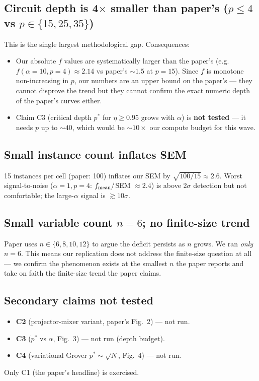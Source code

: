 \documentclass[11pt]{article}
\begin{document}
\subsection{Circuit depth is 4$\times$ smaller than paper's ($p\le 4$ vs $p\in\{15,25,35\}$)}
This is the single largest methodological gap. Consequences:
\begin{itemize}
  \item Our absolute \(f\) values are systematically larger than the
        paper's (e.g.\ \(f(\alpha{=}10,p{=}4)\approx 2.14\) vs paper's
        \(\sim 1.5\) at \(p{=}15\)). Since \(f\) is monotone
        non-increasing in \(p\), our numbers are an upper bound on the
        paper's --- they cannot disprove the trend but they cannot
        confirm the exact numeric depth of the paper's curves either.
  \item Claim C3 (critical depth \(p^*\) for \(\eta\ge 0.95\) grows with
        \(\alpha\)) is \textbf{not tested} --- it needs \(p\) up to
        \(\sim 40\), which would be \(\sim 10\times\) our compute
        budget for this wave.
\end{itemize}

\subsection{Small instance count inflates SEM}
15 instances per cell (paper: 100) inflates our SEM by
\(\sqrt{100/15}\approx 2.6\). Worst signal-to-noise (\(\alpha{=}1,
p{=}4\): \(f_{\rm mean}/\)SEM \(\approx 2.4\)) is above 2\(\sigma\)
detection but not comfortable; the large-\(\alpha\) signal is
\(\gtrsim 10\sigma\).

\subsection{Small variable count $n=6$; no finite-size trend}
Paper uses \(n\in\{6,8,10,12\}\) to argue the deficit persists as \(n\)
grows. We ran \emph{only} \(n=6\). This means our replication does not
address the finite-size question at all --- we confirm the phenomenon
exists at the smallest \(n\) the paper reports and take on faith the
finite-size trend the paper claims.

\subsection{Secondary claims not tested}
\begin{itemize}
  \item \textbf{C2} (projector-mixer variant, paper's Fig.~2) --- not run.
  \item \textbf{C3} (\(p^*\) vs \(\alpha\), Fig.~3) --- not run (depth budget).
  \item \textbf{C4} (variational Grover \(p^*\sim\sqrt{N}\), Fig.~4) --- not run.
\end{itemize}
Only C1 (the paper's headline) is exercised.
\end{document}
